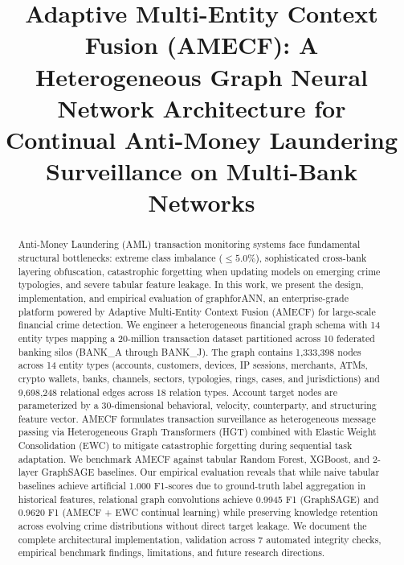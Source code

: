 \documentclass[conference]{IEEEtran}
\begin{document}
\title{Adaptive Multi-Entity Context Fusion (AMECF): A Heterogeneous Graph Neural Network Architecture for Continual Anti-Money Laundering Surveillance on Multi-Bank Networks}

\author{
}

\maketitle

\begin{abstract}
Anti-Money Laundering (AML) transaction monitoring systems face fundamental structural bottlenecks: extreme class imbalance ($\le 5.0\%$), sophisticated cross-bank layering obfuscation, catastrophic forgetting when updating models on emerging crime typologies, and severe tabular feature leakage. In this work, we present the design, implementation, and empirical evaluation of graphforANN, an enterprise-grade platform powered by Adaptive Multi-Entity Context Fusion (AMECF) for large-scale financial crime detection. We engineer a heterogeneous financial graph schema with 14 entity types mapping a 20-million transaction dataset partitioned across 10 federated banking silos (BANK\_A through BANK\_J). The graph contains 1,333,398 nodes across 14 entity types (accounts, customers, devices, IP sessions, merchants, ATMs, crypto wallets, banks, channels, sectors, typologies, rings, cases, and jurisdictions) and 9,698,248 relational edges across 18 relation types. Account target nodes are parameterized by a 30-dimensional behavioral, velocity, counterparty, and structuring feature vector. AMECF formulates transaction surveillance as heterogeneous message passing via Heterogeneous Graph Transformers (HGT) combined with Elastic Weight Consolidation (EWC) to mitigate catastrophic forgetting during sequential task adaptation. We benchmark AMECF against tabular Random Forest, XGBoost, and 2-layer GraphSAGE baselines. Our empirical evaluation reveals that while naive tabular baselines achieve artificial 1.000 F1-scores due to ground-truth label aggregation in historical features, relational graph convolutions achieve 0.9945 F1 (GraphSAGE) and 0.9620 F1 (AMECF + EWC continual learning) while preserving knowledge retention across evolving crime distributions without direct target leakage. We document the complete architectural implementation, validation across 7 automated integrity checks, empirical benchmark findings, limitations, and future research directions.
\end{abstract}
\end{document}
